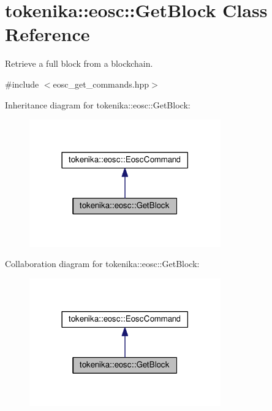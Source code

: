 \hypertarget{classtokenika_1_1eosc_1_1_get_block}{}\section{tokenika\+:\+:eosc\+:\+:Get\+Block Class Reference}
\label{classtokenika_1_1eosc_1_1_get_block}


Retrieve a full block from a blockchain.  




{\ttfamily \#include $<$eosc\+\_\+get\+\_\+commands.\+hpp$>$}



Inheritance diagram for tokenika\+:\+:eosc\+:\+:Get\+Block\+:
\nopagebreak
\begin{figure}[H]
\begin{center}
\leavevmode
\includegraphics[width=234pt]{classtokenika_1_1eosc_1_1_get_block__inherit__graph}
\end{center}
\end{figure}


Collaboration diagram for tokenika\+:\+:eosc\+:\+:Get\+Block\+:
\nopagebreak
\begin{figure}[H]
\begin{center}
\leavevmode
\includegraphics[width=234pt]{classtokenika_1_1eosc_1_1_get_block__coll__graph}
\end{center}
\end{figure}
